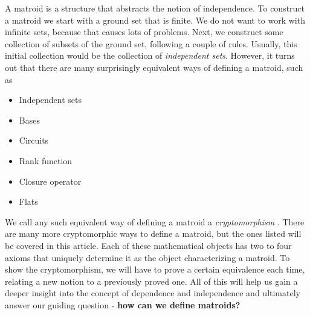A matroid is a structure that abstracts the notion of independence. To construct a matroid we start with a ground set that is finite. We do not want to work with infinite sets, because that causes lots of problems. Next, we construct some collection of subsets of the ground set, following a couple of rules. Usually, this initial collection would be the collection of \textit{independent sets}. However, it turns out that there are many surprisingly equivalent ways of defining a matroid, such as
\begin{multicols}{2}
\begin{itemize}
    \item Independent sets
    \item Bases
    \item Circuits
    \item Rank function
    \item Closure operator
    \item Flats
\end{itemize}
\end{multicols}

We call any such equivalent way of defining a matroid a \textit{cryptomorphism} \cite{gordon_mcnulty_2012}.
There are many more cryptomorphic ways to define a matroid, but the ones listed will be covered in this article. Each of these mathematical objects has two to four axioms that uniquely determine it as the object characterizing a matroid. To show the cryptomorphism, we will have to prove a certain equivalence each time, relating a new notion to a previously proved one. All of this will help us gain a deeper insight into the concept of dependence and independence and ultimately answer our guiding question - \textbf{how can we define matroids?}

